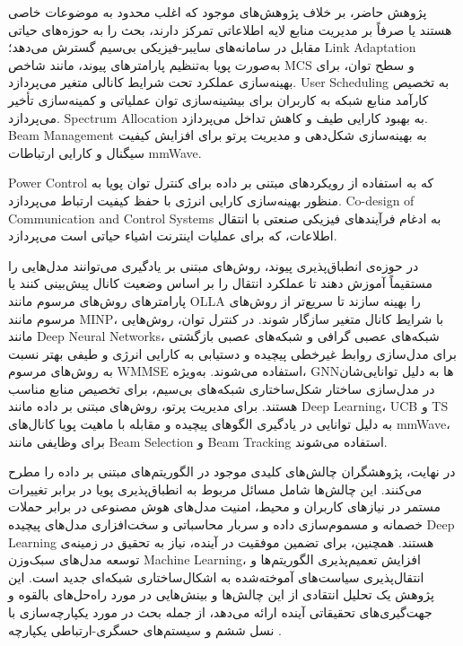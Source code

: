 پژوهش حاضر، بر خلاف پژوهش‌های موجود که اغلب محدود به موضوعات خاصی هستند یا صرفاً بر مدیریت منابع لایه اطلاعاتی تمرکز دارند، بحث را به حوزه‌های حیاتی مقابل در سامانه‌های سایبر-فیزیکی بی‌سیم گسترش می‌دهد؛
\gls{Link Adaptation}
 به‌صورت پویا به‌تنظیم پارامترهای پیوند، مانند شاخص MCS و سطح توان، برای بهینه‌سازی عملکرد تحت شرایط کانالی متغیر می‌پردازد.
\gls{User Scheduling}
به تخصیص کارآمد منابع شبکه به کاربران برای بیشینه‌سازی توان عملیاتی و کمینه‌سازی تأخیر می‌پردازد.
\gls{Spectrum Allocation}
 به بهبود کارایی طیف و کاهش تداخل می‌پردازد.
\gls{Beam Management}
به بهینه‌سازی شکل‌دهی و مدیریت پرتو برای افزایش کیفیت سیگنال و کارایی ارتباطات 
\gls{mmWave}.

\gls{Power Control}
که به استفاده از رویکردهای مبتنی بر داده برای کنترل توان پویا به منظور بهینه‌سازی کارایی انرژی با حفظ کیفیت ارتباط می‌پردازد.
\gls{Co-design of Communication and Control Systems}
 به ادغام فرآیندهای فیزیکی صنعتی با انتقال اطلاعات، که برای عملیات اینترنت اشیاء  حیاتی است می‌پردازد.
 
در حوزه‌ی انطباق‌پذیری پیوند، روش‌های مبتنی بر یادگیری می‌توانند مدل‌هایی را مستقیماً آموزش دهند تا عملکرد انتقال را بر اساس وضعیت کانال پیش‌بینی کنند یا پارامترهای روش‌های مرسوم مانند 
\gls{OLLA}
 را بهینه سازند تا سریع‌تر از روش‌های مرسوم مانند 
\gls{MINP}،
  با شرایط کانال متغیر سازگار شوند. در کنترل توان، روش‌هایی مانند 
\glspl{Deep Neural Network}،
 شبکه‌های عصبی گرافی و شبکه‌های عصبی بازگشتی برای مدل‌سازی روابط غیرخطی پیچیده و دستیابی به کارایی انرژی و طیفی بهتر نسبت به روش‌های مرسوم 
\gls{WMMSE}
  استفاده می‌شوند. به‌ویژه، 
\gls{GNN}ها
   به دلیل توانایی‌شان در مدل‌سازی ساختار شکل‌ساختاری شبکه‌های بی‌سیم، برای تخصیص منابع مناسب هستند. برای مدیریت پرتو، روش‌های مبتنی بر داده مانند 
\gls{Deep Learning}،
\gls{UCB}
 و
\gls{TS}
 به دلیل توانایی در یادگیری الگوهای پیچیده و مقابله با ماهیت پویا کانال‌های 
\gls{mmWave}،
  برای وظایفی مانند 
\gls{Beam Selection}
و
\gls{Beam Tracking}
 استفاده می‌شوند.
 
در نهایت، پژوهشگران چالش‌های کلیدی موجود در الگوریتم‌های مبتنی بر داده را مطرح می‌کنند. این چالش‌ها شامل مسائل مربوط به انطباق‌پذیری پویا در برابر تغییرات مستمر در نیازهای کاربران و محیط، امنیت مدل‌های هوش مصنوعی در برابر حملات خصمانه و مسموم‌سازی داده و سربار محاسباتی و سخت‌افزاری مدل‌های پیچیده 
\gls{Deep Learning}
 هستند. همچنین، برای تضمین موفقیت در آینده، نیاز به تحقیق در زمینه‌ی توسعه مدل‌های سبک‌وزن 
\gls{Machine Learning}،
 افزایش تعمیم‌پذیری الگوریتم‌ها و انتقال‌پذیری سیاست‌های آموخته‌شده به اشکال‌ساختاری‌ شبکه‌ای جدید است.
این پژوهش یک تحلیل انتقادی از این چالش‌ها و بینش‌هایی در مورد راه‌حل‌های بالقوه و جهت‌گیری‌های تحقیقاتی آینده ارائه می‌دهد، از جمله بحث در مورد یکپارچه‌سازی با نسل ششم و سیستم‌های حسگری-ارتباطی یکپارچه
\cite{RecentAdvances}.

